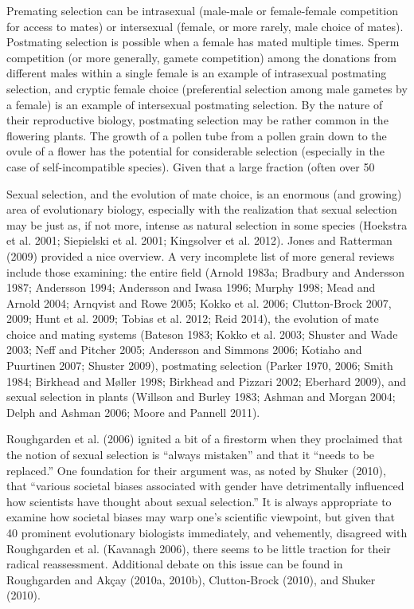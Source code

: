 \documentclass{article}
\begin{document}
Premating selection can be intrasexual (male-male or female-female competition for access to mates) or intersexual (female, or more rarely, male choice of mates). Postmating selection is possible when a female has mated multiple times. Sperm competition (or more generally, gamete competition) among the donations from different males within a single female is an example of intrasexual postmating selection, and cryptic female choice (preferential selection among male gametes by a female) is an example of intersexual postmating selection. By the nature of their reproductive biology, postmating selection may be rather common in the flowering plants. The growth of a pollen tube from a pollen grain down to the ovule of a flower has the potential for considerable selection (especially in the case of self-incompatible species). Given that a large fraction (often over 50%

Sexual selection, and the evolution of mate choice, is an enormous (and growing) area of evolutionary biology, especially with the realization that sexual selection may be just as, if not more, intense as natural selection in some species (Hoekstra et al. 2001; Siepielski et al. 2001; Kingsolver et al. 2012). Jones and Ratterman (2009) provided a nice overview. A very incomplete list of more general reviews include those examining: the entire field (Arnold 1983a; Bradbury and Andersson 1987; Andersson 1994; Andersson and Iwasa 1996; Murphy 1998; Mead and Arnold 2004; Arnqvist and Rowe 2005; Kokko et al. 2006; Clutton-Brock 2007, 2009; Hunt et al. 2009; Tobias et al. 2012; Reid 2014), the evolution of mate choice and mating systems (Bateson 1983; Kokko et al. 2003; Shuster and Wade 2003; Neff and Pitcher 2005; Andersson and Simmons 2006; Kotiaho and Puurtinen 2007; Shuster 2009), postmating selection (Parker 1970, 2006; Smith 1984; Birkhead and Møller 1998; Birkhead and Pizzari 2002; Eberhard 2009), and sexual selection in plants (Willson and Burley 1983; Ashman and Morgan 2004; Delph and Ashman 2006; Moore and Pannell 2011).

Roughgarden et al. (2006) ignited a bit of a firestorm when they proclaimed that the notion of sexual selection is “always mistaken” and that it “needs to be replaced.” One foundation for their argument was, as noted by Shuker (2010), that “various societal biases associated with gender have detrimentally influenced how scientists have thought about sexual selection.” It is always appropriate to examine how societal biases may warp one’s scientific viewpoint, but given that 40 prominent evolutionary biologists immediately, and vehemently, disagreed with Roughgarden et al. (Kavanagh 2006), there seems to be little traction for their radical reassessment. Additional debate on this issue can be found in Roughgarden and Akçay (2010a, 2010b), Clutton-Brock (2010), and Shuker (2010).
\end{document}
